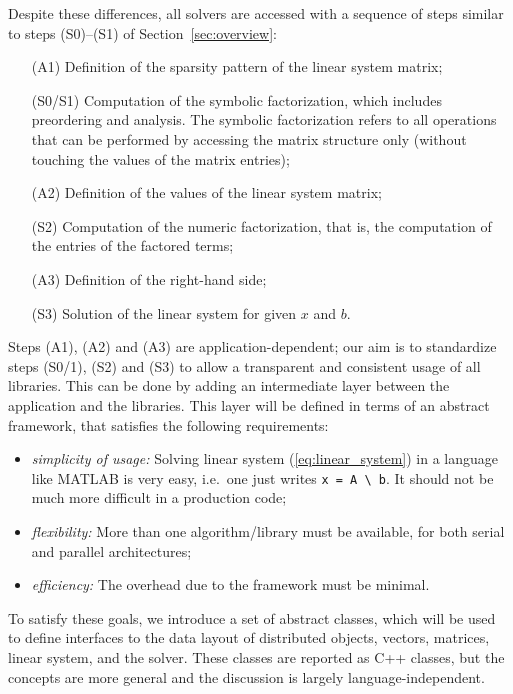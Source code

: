 \documentclass[acmtocl]{acmtrans2m}
\begin{document}
Despite these differences, all solvers are accessed with a sequence of
steps similar to steps (S0)--(S1) of Section~\ref{sec:overview}:
\begin{enumerate}
\item[(A1)] Definition of the sparsity pattern of the linear system matrix;
\item[(S0/S1)] Computation of the symbolic factorization, which includes
preordering and analysis. The
symbolic factorization refers to all operations that can be performed by
accessing the matrix structure only (without touching the values of the matrix entries);
\item[(A2)] Definition of the values of the linear system matrix;
\item[(S2)] Computation of the numeric factorization, that is, the computation
of the entries of the factored terms;
\item[(A3)] Definition of the right-hand side;
\item[(S3)] Solution of the linear system for given $x$ and $b$.
\end{enumerate}
Steps (A1), (A2) and (A3) are application-dependent; 
our aim is to standardize steps (S0/1), (S2)
and (S3) to allow a transparent and consistent usage of all libraries. This
can be done by adding an intermediate layer between the application and the
libraries. This layer will be defined in terms of an abstract framework, that
satisfies the following requirements:
\begin{itemize}

\item {\sl simplicity of usage:} Solving linear system (\ref{eq:linear_system}) in a language
like MATLAB is very easy, i.e.~one just writes \verb!x = A \ b!. It should not be much
more difficult in a production code;

\item {\sl flexibility:} More than one algorithm/library must be available,
  for both serial and parallel architectures;

\item {\sl efficiency:} The overhead due to the framework must be minimal.
\end{itemize}

To satisfy these goals, we introduce a set of abstract classes, which will be
used to define interfaces to the data layout of distributed objects, 
vectors, matrices, linear system, and the solver.
These classes are reported as C++ classes, but the concepts are more general
and the discussion is largely language-independent.
\end{document}
